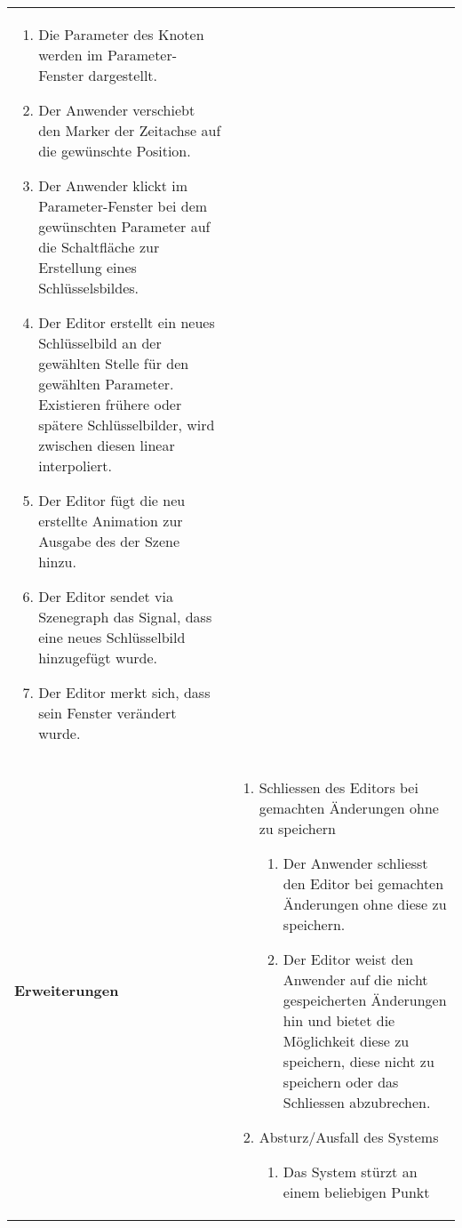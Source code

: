 \begin{longtabu}{p{0.5\textwidth}p{0.5\textwidth}}
\begin{enumerate}
            \item{Die Parameter des Knoten werden im Parameter-Fenster
                    dargestellt.}
            \item{Der Anwender verschiebt den Marker der Zeitachse auf
                    die gewünschte Position.}
            \item{Der Anwender klickt im Parameter-Fenster bei dem
                    gewünschten Parameter auf die Schaltfläche zur
                    Erstellung eines Schlüsselsbildes.}
            \item{Der Editor erstellt ein neues Schlüsselbild an der
                    gewählten Stelle für den gewählten Parameter.
                    Existieren frühere oder spätere Schlüsselbilder, wird
                    zwischen diesen linear interpoliert.}
            \item{Der Editor fügt die neu erstellte Animation zur Ausgabe des
                    der Szene hinzu.}
            \item{Der Editor sendet via Szenegraph das Signal, dass eine
                    neues Schlüsselbild hinzugefügt wurde.}
            \item{Der Editor merkt sich, dass sein Fenster verändert
                    wurde.}
        \end{enumerate} \\
    \cmidrule(r){1-1}\cmidrule(lr){2-2}
        \textbf{Erweiterungen} &
        \begin{enumerate}[label= (\alph*)]
            \item{Schliessen des Editors bei gemachten Änderungen ohne zu
                    speichern
                \begin{enumerate}[label= (\roman*)]
                    \item{Der Anwender schliesst den Editor bei gemachten
                            Änderungen ohne diese zu speichern.}
                    \item{Der Editor weist den Anwender auf die
                            nicht gespeicherten Änderungen hin und bietet
                            die Möglichkeit diese zu speichern, diese nicht
                            zu speichern oder das Schliessen abzubrechen.}
                \end{enumerate}
            }
            \item{Absturz/Ausfall des Systems
                \begin{enumerate}[label= (\roman*)]
                        \item{Das System stürzt an einem beliebigen Punkt
}
\end{enumerate}}
\end{enumerate}
\end{longtabu}
